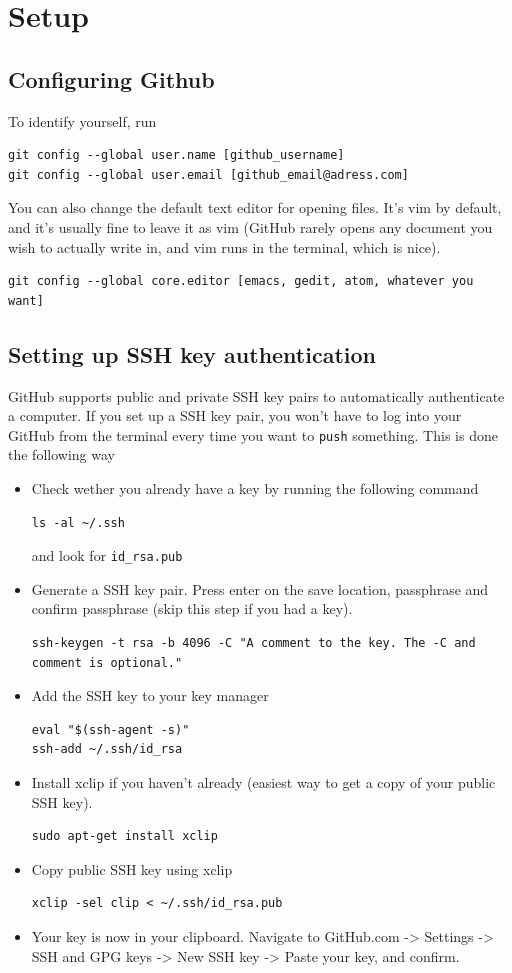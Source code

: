 \documentclass[12p,a4paper]{article}
\begin{document}
\section{Setup}
\subsection{Configuring Github}
To identify yourself, run
\begin{verbatim}
git config --global user.name [github_username]
git config --global user.email [github_email@adress.com]
\end{verbatim}
You can also change the default text editor for opening files. It's vim by default, and it's usually fine to leave it as vim (GitHub rarely opens any document you wish to actually write in, and vim runs in the terminal, which is nice).
\begin{verbatim}
git config --global core.editor [emacs, gedit, atom, whatever you want]
\end{verbatim}


\subsection{Setting up SSH key authentication}
GitHub supports public and private SSH key pairs to automatically authenticate a computer. If you set up a SSH key pair, you won't have to log into your GitHub from the terminal every time you want to \texttt{push} something. This is done the following way
\begin{itemize}
\item Check wether you already have a key by running the following command
\begin{verbatim}
ls -al ~/.ssh
\end{verbatim}
and look for \texttt{id\_rsa.pub}
\item Generate a SSH key pair. Press enter on the save location, passphrase and confirm passphrase (skip this step if you had a key).
\begin{verbatim}
ssh-keygen -t rsa -b 4096 -C "A comment to the key. The -C and comment is optional."
\end{verbatim}
\item Add the SSH key to your key manager
\begin{verbatim}
eval "$(ssh-agent -s)"
ssh-add ~/.ssh/id_rsa
\end{verbatim}
\item Install xclip if you haven't already (easiest way to get a copy of your public SSH key).
\begin{verbatim}
sudo apt-get install xclip
\end{verbatim}
\item Copy public SSH key using xclip
\begin{verbatim}
xclip -sel clip < ~/.ssh/id_rsa.pub
\end{verbatim}
\item Your key is now in your clipboard. Navigate to GitHub.com -> Settings -> SSH and GPG keys -> New SSH key -> Paste your key, and confirm.
\end{itemize}
\end{document}
